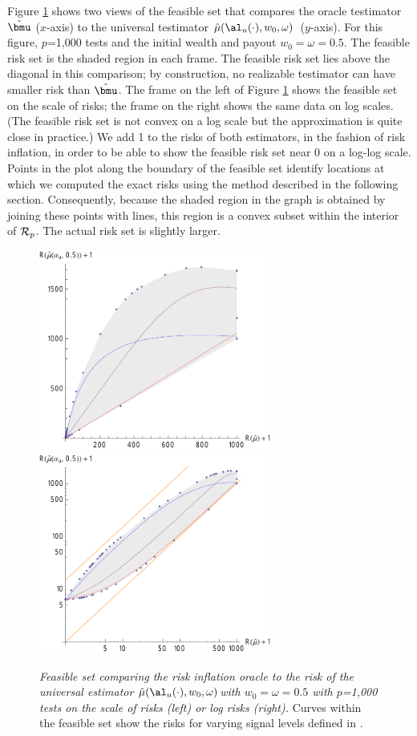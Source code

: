 \documentclass[12pt]{article}
\newcommand{\uTest}{\mbox{$\hat\mu(\al_u(\cdot),w_0,\omega)$}}
\begin{document}
 Figure \ref{fig:riFeasibleSet} shows two views of the feasible set that
 compares the oracle testimator $\tilde{\bmu}$ ($x$-axis) to the universal
 testimator \uTest\ ($y$-axis).  For this figure, $p$=1,000 tests and the
 initial wealth and payout $w_0 = \omega = 0.5$.  The feasible risk set is the
 shaded region in each frame.  The feasible risk set lies above the diagonal in
 this comparison; by construction, no realizable testimator can have smaller
 risk than $\tilde{\bmu}$.  The frame on the left of Figure
 \ref{fig:riFeasibleSet} shows the feasible set on the scale of risks; the frame
 on the right shows the same data on log scales.  (The feasible risk set is not
 convex on a log scale but the approximation is quite close in practice.)  We
 add 1 to the risks of both estimators, in the fashion of risk inflation, in
 order to be able to show the feasible risk set near 0 on a log-log scale.
  Points in the plot along the boundary of the feasible set identify locations
 at which we computed the exact risks using the method described in the
 following section.  Consequently, because the shaded region in the graph is
 obtained by joining these points with lines, this region is a convex subset
 within the interior of ${\cal R}_p$.  The actual risk set is slightly larger.


 \begin{figure}
 \caption{ \label{fig:riFeasibleSet} {\sl Feasible set comparing the risk
 inflation oracle to the risk of the universal estimator \uTest with
 $w_0=\omega=0.5$ with $p$=1,000 tests on the scale of risks (left) or log risks
 (right).}  Curves within the feasible set show the risks for varying signal
 levels defined in . }

 \vspace{0.1in}
\centerline{
 \includegraphics[width=3.0in]{figures/riFeasSet}
 \includegraphics[width=3.0in]{figures/riFeasSetLog} }
 \vspace{0.2in}
 \end{figure}
\end{document}
